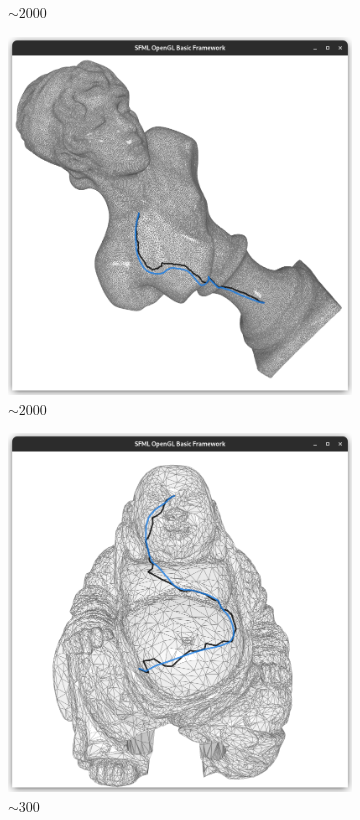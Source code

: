 \documentclass{stdlocal}
\begin{document}
\begin{figure}
\begin{subfigure}[b]{0.24\linewidth}
    \caption{$\sim 2000$}
  \end{subfigure}
  \begin{subfigure}[b]{0.24\linewidth}
    \centering
    \includegraphics[width=\linewidth,trim={25px 20 25 50},clip]{images/sappho-smooth-1.png}
    \caption{$\sim 2000$}
  \end{subfigure}
  \begin{subfigure}[b]{0.24\linewidth}
    \centering
    \includegraphics[width=\linewidth,trim={25px 20 25 50},clip]{images/buddha-smooth-1.png}
    \caption{$\sim 300$}
  \end{subfigure}
  \caption[]{}
  \label{fig:}
\end{figure}
\end{document}
